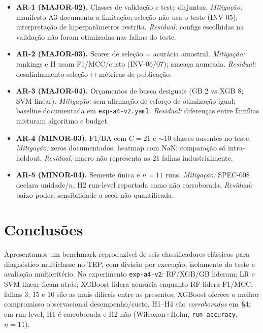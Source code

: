 \documentclass[11pt,a4paper]{article}
\begin{document}
\begin{itemize}
  \item \textbf{AR-1 (MAJOR-02).} Classes de validação e teste disjuntas.
  \emph{Mitigação:} manifesto A3 documenta a limitação; seleção não usa o teste
  (INV-05); interpretação de hiperparâmetros restrita. \emph{Residual:} configs
  escolhidas na validação não foram otimizadas nas falhas do teste.
  \item \textbf{AR-2 (MAJOR-03).} Scorer de seleção = acurácia amostral.
  \emph{Mitigação:} rankings e H usam F1/MCC/custo (INV-06/07); ameaça nomeada.
  \emph{Residual:} desalinhamento seleção$\leftrightarrow$métricas de publicação.
  \item \textbf{AR-3 (MAJOR-04).} Orçamentos de busca desiguais (GB 2 vs XGB 8;
  SVM linear). \emph{Mitigação:} sem afirmação de esforço de otimização igual;
  baseline documentada em \texttt{exp-a4-v2.yaml}. \emph{Residual:} diferenças
  entre famílias misturam algoritmo e budget.
  \item \textbf{AR-4 (MINOR-03).} F1/BA com $C{=}21$ e $\sim$10 classes ausentes
  no teste. \emph{Mitigação:} zeros documentados; heatmap com NaN;
  comparação só intra-holdout. \emph{Residual:} macro não representa as 21
  falhas industrialmente.
  \item \textbf{AR-5 (MINOR-04).} Semente única e $n{=}11$ runs. \emph{Mitigação:}
  SPEC-008 declara unidade/\(n\); H2 run-level reportada como não corroborada.
  \emph{Residual:} baixo poder; sensibilidade a seed não quantificada.
\end{itemize}

\section{Conclusões}
\label{sec:conclusoes}

Apresentamos um benchmark reproduzível de seis classificadores clássicos para
diagnóstico multiclasse no TEP, com divisão por execução, isolamento do teste e
avaliação multicritério. No experimento \texttt{exp-a4-v2}: RF/XGB/GB lideram;
LR e SVM linear ficam atrás; XGBoost lidera acurácia enquanto RF lidera F1/MCC;
falhas 3, 15 e 10 são as mais difíceis entre as presentes; XGBoost oferece o
melhor compromisso observacional desempenho/custo. H1--H4 são \emph{corroboradas}
em~\S4; em run-level, H1 é corroborada e H2 não (Wilcoxon+Holm,
\texttt{run\_accuracy}, $n{=}11$).
\end{document}
